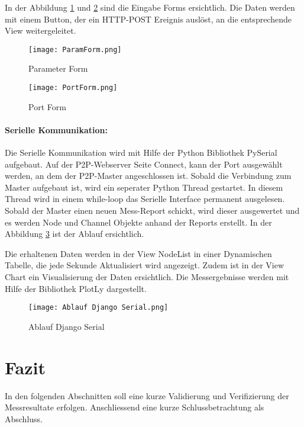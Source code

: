 In der Abbildung \ref{fig:ParamForm} und \ref{fig:PortForm} sind die Eingabe Forms ersichtlich. Die Daten werden mit einem Button, der ein HTTP-POST Ereignis auslöst, an die entsprechende View weitergeleitet.

\begin{figure} [H]
	\centering
	\texttt{[image: ParamForm.png]}
	\caption{Parameter Form}
	\label{fig:ParamForm}
\end{figure}


\begin{figure} [H]
	\centering
	\texttt{[image: PortForm.png]}
	\caption{Port Form}
	\label{fig:PortForm}
\end{figure}

\newpage

\paragraph{Serielle Kommunikation: }\label{par:SerielleKommunikation}
Die Serielle Kommunikation wird mit Hilfe der Python Bibliothek PySerial aufgebaut. Auf der P2P-Webserver Seite Connect, kann der Port ausgewählt werden, an dem der P2P-Master angeschlossen ist. Sobald die Verbindung zum Master aufgebaut ist, wird ein seperater Python Thread gestartet. In diesem Thread wird in einem while-loop das Serielle Interface permanent ausgelesen. Sobald der Master einen neuen Mess-Report schickt, wird dieser ausgewertet und es werden Node und Channel Objekte anhand der Reports erstellt. In der Abbildung \ref{fig:AblaufDjangoSerial} ist der Ablauf ersichtlich.

Die erhaltenen Daten werden in der View Node\textunderscore List in einer Dynamischen Tabelle, die jede Sekunde Aktualisiert wird angezeigt. Zudem ist in der View Chart ein Visualisierung der Daten ersichtlich. Die Messergebnisse werden mit Hilfe der Bibliothek PlotLy dargestellt. \\

\begin{figure} [H]
	\centering
	\texttt{[image: Ablauf Django Serial.png]}
	\caption{Ablauf Django Serial}
	\label{fig:AblaufDjangoSerial}
\end{figure}


\section{Fazit}\label{sec:FazitP2P}

In den folgenden Abschnitten soll eine kurze Validierung und Verifizierung der Messresultate erfolgen. Anschliessend eine kurze Schlussbetrachtung als Abschluss. 

